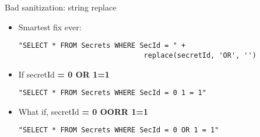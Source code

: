 \begin{frame}[fragile]{Bad sanitization: string replace}
  \ccode
  \begin{itemize}
    \item Smartest fix ever:
\begin{lstlisting}
"SELECT * FROM Secrets WHERE SecId = " +
                              replace(secretId, 'OR', '')
\end{lstlisting}
\pause
    \item If secretId \textbf{= 0 OR 1=1}
\begin{lstlisting}
"SELECT * FROM Secrets WHERE SecId = 0 1 = 1"
\end{lstlisting}
\pause
    \item What if, secretId \textbf{= 0 OORR 1=1}
\begin{lstlisting}
"SELECT * FROM Secrets WHERE SecId = 0 OR 1 = 1"
\end{lstlisting}
  \end{itemize}
\end{frame}
